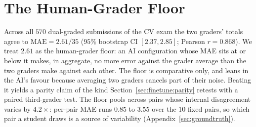 \section{The Human-Grader Floor}
\label{sec:floor}

Across all $570$ dual-graded submissions of the CV exam the two graders' totals agree to $\text{MAE} = 2.61 / 35$ ($95\%$ bootstrap CI $[2.37, 2.85]$; Pearson $r = 0.868$). We treat $2.61$ as the human-grader floor: an AI configuration whose MAE sits at or below it makes, in aggregate, no more error against the grader average than the two graders make against each other. The floor is comparative only, and leans in the AI's favour because averaging two graders cancels part of their noise. Beating it yields a parity claim of the kind Section~\ref{sec:finetune:parity} retests with a paired third-grader test. The floor pools across pairs whose internal disagreement varies by $4.2\times$: per-pair MAE runs $0.85$ to $3.55$ over the $10$ fixed pairs, so which pair a student draws is a source of variability (Appendix~\ref{sec:groundtruth}).
